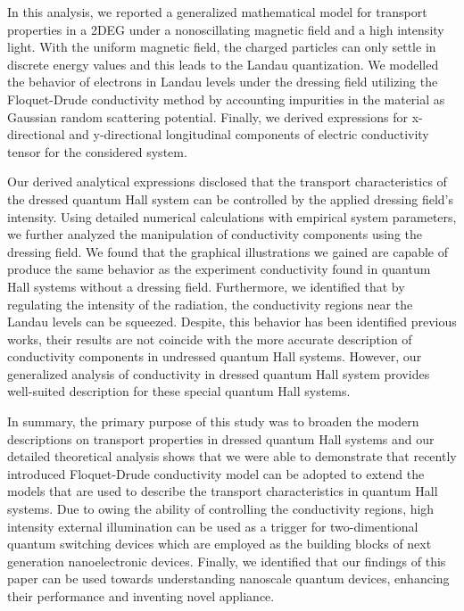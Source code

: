 In this analysis, we reported a generalized mathematical model for transport properties in a 2DEG under a nonoscillating magnetic field and a high intensity light. With the uniform magnetic field, the charged particles can only settle in discrete energy values and this leads to the Landau quantization. We modelled the behavior of electrons in Landau levels under the dressing field utilizing the Floquet-Drude conductivity method by accounting impurities in the material as Gaussian random scattering potential. Finally, we derived expressions for x-directional and y-directional longitudinal components of electric conductivity tensor for the considered system.

Our derived analytical expressions disclosed that the transport characteristics of the dressed quantum Hall system can be controlled by the applied dressing field’s intensity. Using detailed numerical calculations with empirical system parameters, we further analyzed the manipulation of conductivity components using the dressing field. We found that the graphical illustrations we gained are capable of produce the same behavior as the experiment conductivity found in quantum Hall systems without a dressing field. Furthermore, we identified that by regulating the intensity of the radiation, the conductivity regions near the Landau levels can be squeezed. Despite, this behavior has been identified previous works, their results are not coincide with the more accurate description of conductivity components in undressed quantum Hall systems. However, our generalized analysis of conductivity in dressed quantum Hall system provides well-suited description for these special quantum Hall systems.

In summary, the primary purpose of this study was to broaden the modern descriptions on transport properties in dressed quantum Hall systems and our  detailed theoretical analysis shows that we were able to demonstrate that recently introduced Floquet-Drude conductivity model can be adopted to extend the models that are used to describe the transport characteristics in quantum Hall systems. Due to owing the ability of controlling the conductivity regions, high intensity external illumination can be used as a trigger for two-dimentional quantum switching devices which are employed as the building blocks of next generation nanoelectronic devices. Finally, we identified that our findings of this paper can be used towards understanding nanoscale quantum devices, enhancing their performance and inventing novel appliance.
